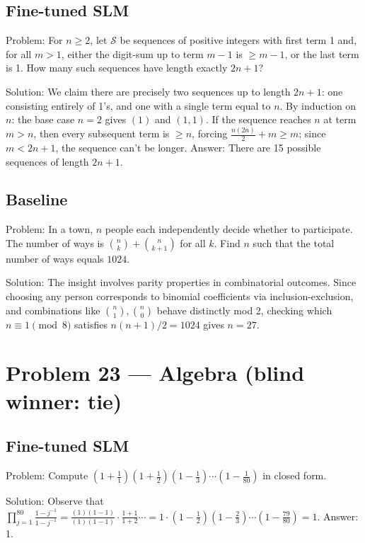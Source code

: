 \documentclass[11pt]{article}
\begin{document}
\subsection*{Fine-tuned SLM}

Problem:
For $n\ge2$, let $\mathcal S$ be sequences of positive integers with first term 1 and, for all $m>1$, either the digit-sum up to term $m-1$ is $\ge m-1$, or the last term is 1. How many such sequences have length exactly $2n+1$?

Solution:
We claim there are precisely two sequences up to length $2n+1$: one consisting entirely of 1's, and one with a single term equal to $n$. By induction on $n$: the base case $n=2$ gives $(1)$ and $(1,1)$. If the sequence reaches $n$ at term $m>n$, then every subsequent term is $\ge n$, forcing $\frac{n(2n)}2+m\ge m$; since $m<2n+1$, the sequence can't be longer. Answer: There are 15 possible sequences of length $2n+1$.

\subsection*{Baseline}

Problem:
In a town, $n$ people each independently decide whether to participate. The number of ways is $\binom{n}{k} + \binom{n}{k+1}$ for all $k$. Find $n$ such that the total number of ways equals $1024$.

Solution:
The insight involves parity properties in combinatorial outcomes. Since choosing any person corresponds to binomial coefficients via inclusion-exclusion, and combinations like $\binom n1, \binom n0$ behave distinctly mod 2, checking which $n \equiv 1 \pmod 8$ satisfies $n(n+1)/2 = 1024$ gives $n = 27$.

\section*{Problem 23 --- Algebra \quad(blind winner: tie)}

\subsection*{Fine-tuned SLM}

Problem:
Compute $(1+\frac{1}{1})(1+\frac{1}{2})(1-\frac{1}{3})\cdots(1-\frac{1}{80})$ in closed form.

Solution:
Observe that $\prod_{j=1}^{80}\frac{1-j^{-1}}{1-j^{-1}}=\frac{(1)(1-1)}{(1)(1-1)}\cdot\frac{1+1}{1+2}\cdots=1\cdot(1-\frac12)(1-\frac23)\cdots(1-\frac{79}{80})=1$. Answer: 1.
\end{document}
